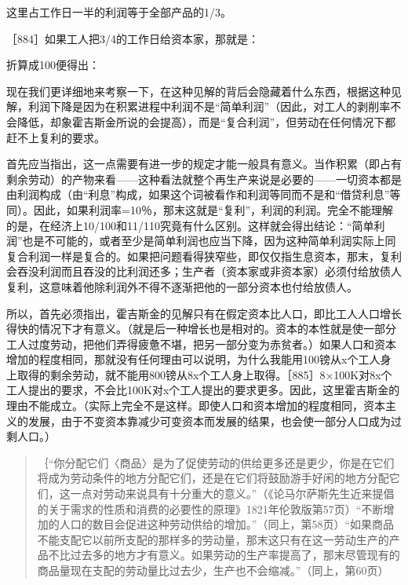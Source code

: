 \todo{}

这里占工作日一半的利润等于全部产品的1/3。

［884］如果工人把3/4的工作日给资本家，那就是：

\todo{}

折算成100便得出：

\todo{}

现在我们更详细地来考察一下，在这种见解的背后会隐藏着什么东西，根据这种见解，利润下降是因为在积累进程中利润不是“简单利润”（因此，对工人的剥削率不会降低，却象霍吉斯金所说的会提高），而是“复合利润”，但劳动在任何情况下都赶不上复利的要求。

首先应当指出，这一点需要有进一步的规定才能一般具有意义。当作积累（即占有剩余劳动）的产物来看——这种看法就整个再生产来说是必要的——一切资本都是由利润构成（由“利息”构成，如果这个词被看作和利润等同而不是和“借贷利息”等同）。因此，如果利润率=10％，那末这就是“复利”，利润的利润。完全不能理解的是，在经济上10/100和11/110究竟有什么区别。这样就会得出结论：“简单利润”也是不可能的，或者至少是简单利润也应当下降，因为这种简单利润实际上同复合利润一样是复合的。如果把问题看得狭窄些，即仅仅指生息资本，那末，复利会吞没利润而且吞没的比利润还多；生产者（资本家或非资本家）必须付给放债人复利，这意味着他除利润外不得不逐渐把他的一部分资本也付给放债人。

所以，首先必须指出，霍吉斯金的见解只有在假定资本比人口，即比工人人口增长得快的情况下才有意义。（就是后一种增长也是相对的。资本的本性就是使一部分工人过度劳动，把他们弄得疲惫不堪，把另一部分变为赤贫者。）如果人口和资本增加的程度相同，那就没有任何理由可以说明，为什么我能用100镑从x个工人身上取得的剩余劳动，就不能用800镑从8x个工人身上取得。［885］8×100K对8x个工人提出的要求，不会比100K对x个工人提出的要求更多。因此，这里霍吉斯金的理由不能成立。（实际上完全不是这样。即使人口和资本增加的程度相同，资本主义的发展，由于不变资本靠减少可变资本而发展的结果，也会使一部分人口成为过剩人口。）

\begin{quote}{｛“你分配它们〈商品〉是为了促使劳动的供给更多还是更少，你是在它们将成为劳动条件的地方分配它们，还是在它们将鼓励游手好闲的地方分配它们，这一点对劳动来说具有十分重大的意义。”（《论马尔萨斯先生近来提倡的关于需求的性质和消费的必要性的原理》1821年伦敦版第57页）“不断增加的人口的数目会促进这种劳动供给的增加。”（同上，第58页）“如果商品不能支配它以前所支配的那样多的劳动量，那末这只有在这一劳动生产的产品不比过去多的地方才有意义。如果劳动的生产率提高了，那末尽管现有的商品量现在支配的劳动量比过去少，生产也不会缩减。”（同上，第60页）}\end{quote}

